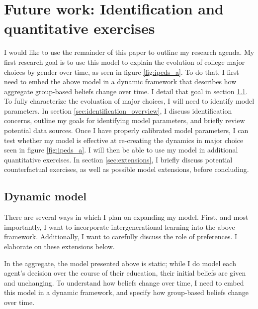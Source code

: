 \section{Future work: Identification and quantitative exercises}\label{sec:future_work}

I would like to use the remainder of this paper to outline my research agenda. 
My first research goal is to use this model to explain the evolution of college major choices by gender over time, as seen in figure \ref{fig:ipeds_a}.
To do that, I first need to embed the above model in a dynamic framework that describes how aggregate group-based beliefs change over time. 
I detail that goal in section \ref{sec:dynamic_model}.
To fully characterize the evoluation of major choices, I will need to identify model parameters.
In section \ref{sec:identification_overview}, I discuss identification concerns, outline my goals for identifying model parameters, and briefly review potential data sources.
Once I have properly calibrated model parameters, I can test whether my model is effective at re-creating the dynamics in major choice seen in figure \ref{fig:ipeds_a}.
I will then be able to use my model in additional quantitative exercises.
In section \ref{sec:extensions}, I briefly discuss potential counterfactual exercises, as well as possible model extensions, before concluding. 

\subsection{Dynamic model}\label{sec:dynamic_model}

There are several ways in which I plan on expanding my model.
First, and most importantly, I want to incorporate intergenerational learning into the above framework.
Additionally, I want to carefully discuss the role of preferences. I elaborate on these extensions below.

In the aggregate, the model presented above is static; while I do model each agent's decision over the course of their education, their initial beliefs are given and unchanging.
To understand how beliefs change over time, I need to embed this model in a dynamic framework, and specify how group-based beliefs change over time.


